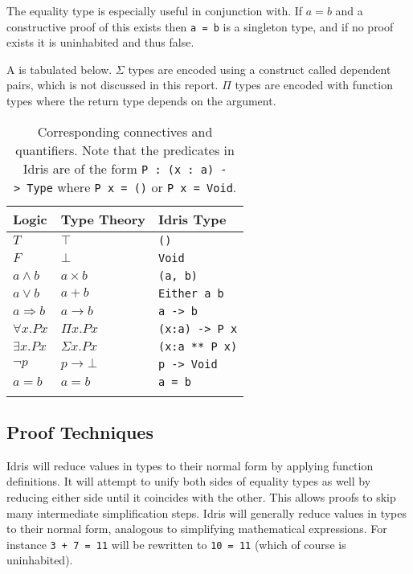 \documentclass[]{report}
\begin{document}
The equality type is especially useful in conjunction with. If $a=b$ and a constructive proof of this exists then \texttt{a = b} is a singleton type, and if no proof exists it is uninhabited and thus false.

A  is tabulated below.  $\Sigma$ types are encoded using a construct called dependent pairs, which is not discussed in this report. $\Pi$ types are encoded with function types where the return type depends on the argument.

\begin{longtable}[]{@{}lll@{}}
	\toprule
	Logic & Type Theory & Idris
	Type \\
	\midrule
	\endhead
	{\(T\)} & {\(\top\)} & \texttt{()} \\
	{\(F\)} & {\(\bot\)} & \texttt{Void} \\
	{\(a \land b\)} & {\(a \times b\)} & \texttt{(a,\ b)} \\
	{\(a \vee b\)} & {\(a + b\)} & \texttt{Either\ a\ b} \\
	{\(a\Rightarrow b\)} & {\(a \rightarrow b\)} &
	\texttt{a\ -\textgreater{}\ b} \\
	{\(\forall x.Px\)} & {\(\Pi x.Px\)} &
	\texttt{(x:a)\ -\textgreater{}\ P\ x} \\
	{\(\exists x.Px\)} & {\(\Sigma x.Px\)} & \texttt{(x:a\ **\ P\ x)} \\
	{\(\neg p\)} & {\(p \rightarrow \bot\)} &
	\texttt{p\ -\textgreater{}\ Void} \\
	{$a=b$} & {$a=b$} & {\texttt{a = b}} \\
	\bottomrule
	\caption{Corresponding connectives and quantifiers. Note that the predicates in Idris are of the form \texttt{P\ :\ (x\ :\ a)\ -\textgreater{}\ Type} where \texttt{P\ x\ =\ ()} or \texttt{P\ x\ =\ Void}.}
\end{longtable}

\subsection{Proof Techniques}

Idris will reduce values in types to their normal form by applying function definitions. It will attempt to unify both sides of equality types as well by reducing either side until it coincides with the other. This allows proofs to skip many intermediate simplification steps. Idris will generally reduce values in types to their normal form, analogous to simplifying mathematical expressions. For instance \texttt{3 + 7 = 11} will be rewritten to \texttt{10 = 11} (which of course is uninhabited).
\end{document}
